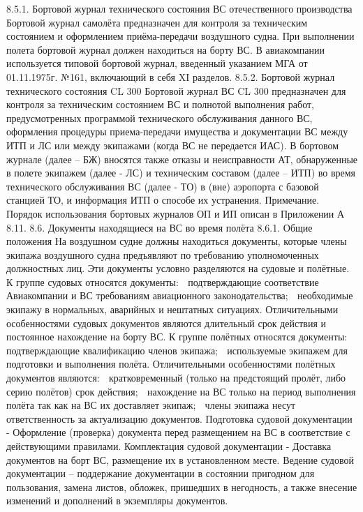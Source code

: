 8.5.1. Бортовой журнал технического состояния ВС отечественного производства
Бортовой журнал самолёта предназначен для контроля за техническим состоянием и оформлением приёма-передачи воздушного судна. При выполнении полета бортовой журнал должен находиться на борту ВС.
В авиакомпании используется типовой бортовой журнал, введенный указанием МГА от 01.11.1975г. №161, включающий в себя XI разделов.
8.5.2. Бортовой журнал технического состояния CL 300 
Бортовой журнал ВС CL 300 предназначен для контроля за техническим состоянием ВС и полнотой выполнения работ, предусмотренных программой технического обслуживания данного ВС, оформления процедуры приема-передачи имущества и документации ВС между ИТП и ЛС или между экипажами (когда ВС не передается ИАС).
В бортовом журнале (далее – БЖ) вносятся также отказы и неисправности АТ, обнаруженные в полете экипажем (далее - ЛС) и техническим составом (далее – ИТП) во время технического обслуживания ВС (далее - ТО) в (вне) аэропорта с базовой станцией ТО, и информация ИТП о способе их устранения.
Примечание. Порядок использования бортовых журналов ОП и ИП описан в Приложении А 8.11.
8.6. Документы находящиеся на ВС во время полёта
8.6.1. Общие положения 
На воздушном судне должны находиться документы, которые члены экипажа воздушного судна предъявляют по требованию уполномоченных должностных лиц. Эти документы условно разделяются на судовые и полётные.
К группе судовых относятся документы:
	подтверждающие соответствие Авиакомпании и ВС требованиям авиационного законодательства;
	необходимые экипажу в нормальных, аварийных и нештатных ситуациях.
Отличительными особенностями судовых документов являются длительный срок действия и постоянное нахождение на борту ВС.
К группе полётных относятся документы:
	подтверждающие квалификацию членов экипажа;
	используемые экипажем для подготовки и выполнения полёта.
Отличительными особенностями полётных документов являются:
	кратковременный (только на предстоящий пролёт, либо серию полётов) срок действия;
	нахождение на ВС только на период выполнения полёта так как на ВС их доставляет экипаж;
	члены экипажа несут ответственность за актуализацию документов. 
Подготовка судовой документации - Оформление (проверка) документа перед размещением на ВС в соответствие с действующими правилами.
Комплектация судовой документации - Доставка документов на борт ВС, размещение их в установленном месте.
Ведение судовой документации – поддержание документации в состоянии пригодном для пользования, замена листов, обложек, пришедших в негодность, а также внесение изменений и дополнений в экземпляры документов.
